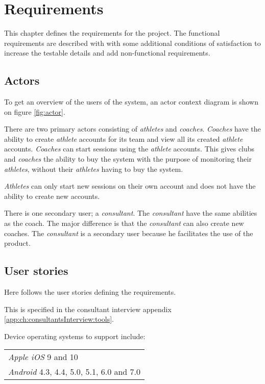 \chapter{Requirements}\label{ch:Requirements}
This chapter defines the requirements for the project.
The functional requirements are described with  with some additional conditions of satisfaction to increase the testable details and add non-functional requirements.

\section{Actors}
To get an overview of the users of the system, an actor context diagram is shown on figure \ref{fig:actor}.

There are two primary actors consisting of \textit{athletes} and \textit{coaches}. 
\textit{Coaches} have the ability to create \textit{athlete} accounts for its team and view all its created \textit{athlete} accounts.
\textit{Coaches} can start sessions using the \textit{athlete} accounts.
This gives clubs and \textit{coaches} the ability to buy the system with the purpose of monitoring their \textit{athletes}, without their \textit{athletes} having to buy the system.

\textit{Athletes} can only start new sessions on their own account and does not have the ability to create new accounts.

There is one secondary user; a \textit{consultant}.
The \textit{consultant} have the same abilities as the coach. The major difference is that the \textit{consultant} can also create new coaches.
The \textit{consultant} is a secondary user because he facilitates the use of the product.


\section{User stories}
Here follows the user stories defining the requirements.


This  is specified in the consultant interview appendix \ref{app:ch:consultantsInterview:tools}.

Device operating systems to support include: \newline
\begin{tabularx}{\textwidth}{X}
    \textit{Apple iOS} 9 and 10 \\
    \textit{Android} 4.3, 4.4, 5.0, 5.1, 6.0 and 7.0
\end{tabularx}

